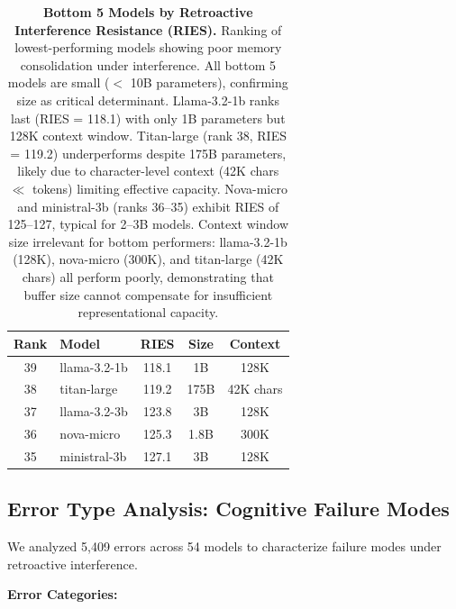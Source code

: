 \documentclass{article}
\begin{document}
\begin{table}[t]
\centering
\caption{\textbf{Bottom 5 Models by Retroactive Interference Resistance (RIES).}
Ranking of lowest-performing models showing poor memory consolidation under interference.
All bottom 5 models are small ($<$ 10B parameters), confirming size as critical determinant.
Llama-3.2-1b ranks last (RIES = 118.1) with only 1B parameters but 128K context window.
Titan-large (rank 38, RIES = 119.2) underperforms despite 175B parameters, likely due to character-level context (42K chars $\ll$ tokens) limiting effective capacity.
Nova-micro and ministral-3b (ranks 36--35) exhibit RIES of 125--127, typical for 2--3B models.
Context window size irrelevant for bottom performers: llama-3.2-1b (128K), nova-micro (300K), and titan-large (42K chars) all perform poorly, demonstrating that buffer size cannot compensate for insufficient representational capacity.}
\begin{tabular}{clccc}
\toprule
Rank & Model & RIES & Size & Context \\
\midrule
39 & llama-3.2-1b & 118.1 & 1B & 128K \\
38 & titan-large & 119.2 & 175B & 42K chars \\
37 & llama-3.2-3b & 123.8 & 3B & 128K \\
36 & nova-micro & 125.3 & 1.8B & 300K \\
35 & ministral-3b & 127.1 & 3B & 128K \\
\bottomrule
\end{tabular}
\end{table}

\subsection{Error Type Analysis: Cognitive Failure Modes}

We analyzed 5,409 errors across 54 models to characterize failure modes under retroactive interference.

\textbf{Error Categories:}
\end{document}
